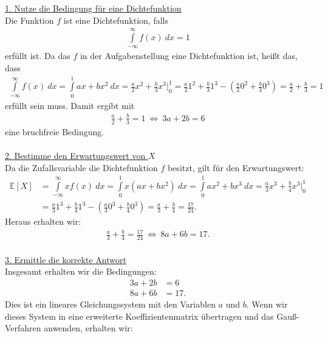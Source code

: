 \underline{1. Nutze die Bedingung für eine Dichtefunktion}\\
Die Funktion $ f $ ist eine Dichtefunktion, falls
\begin{align*}
\int \limits_{- \infty}^\infty f(x) \ dx
= 1
\end{align*}
erfüllt ist. Da das $ f $ in der Aufgabenstellung eine Dichtefunktion ist, heißt das, dass
\begin{align*}
\int \limits_{- \infty}^\infty f(x) \ dx
=
\int \limits_{0}^1 ax + bx^2 \ dx
=
 \frac{a}{2} x^2 + \frac{b}{3} x^3 \bigg|_0^1
=
\frac{a}{2}1^2 + \frac{b}{3} 1^3 - \left( \frac{a}{2}0^2 + \frac{b}{3} 0^3\right)
= \frac{a}{2} + \frac{b}{3} = 1
\end{align*}
erfüllt sein muss. Damit ergibt mit
\begin{align*}
\frac{a}{2} + \frac{b}{3} = 1
\ \Leftrightarrow \
3 a + 2 b = 6
\end{align*}
eine bruchfreie Bedingung.\\
\\
\newpage
\underline{2. Bestimme den Erwartungswert von $ X $}\\
Da die Zufallsvariable die Dichtefunktion $ f $ besitzt, gilt für den Erwartungswert:
\begin{align*}
\mathbb{E}[X]
&=
\int \limits_{- \infty}^\infty x f(x) \ dx
=
\int \limits_{0}^1 x(ax + bx^2) \ dx
=
\int \limits_{0}^1 ax^2 + bx^3 \ dx
=
\frac{a}{3} x^3 + \frac{b}{4} x^3 \bigg|_0^1 \\
&=
\frac{a}{3} 1^3 + \frac{b}{4} 1^3 - 
\left( \frac{a}{3} 0^3 + \frac{b}{4} 0^3\right)
=
\frac{a}{3}  + \frac{b}{4}
= \frac{17}{24}.
\end{align*}
Heraus erhalten wir:
\begin{align*}
\frac{a}{3}  + \frac{b}{4}
= \frac{17}{24}
\ \Leftrightarrow \
8 a + 6 b = 17.
\end{align*}
\ \\
\underline{3. Ermittle die korrekte Antwort}\\
Insgesamt erhalten wir die Bedingungen:
\begin{align*}
3 a + 2 b &= 6\\
8 a + 6 b &= 17.
\end{align*}
Dies ist ein lineares Gleichungssystem mit den Variablen $ a $ und $ b $.
Wenn wir dieses System in eine erweiterte Koeffizientenmatrix übertragen und das  Gauß-Verfahren anwenden, erhalten wir:
